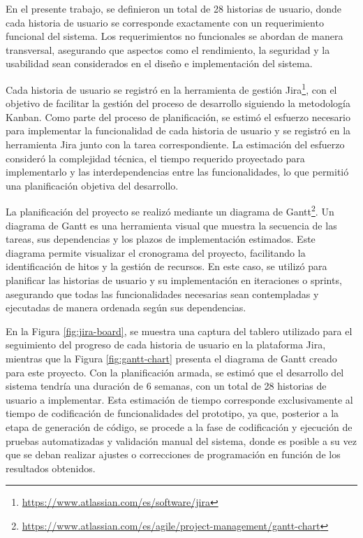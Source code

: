 En el presente trabajo, se definieron un total de 28 historias de usuario, donde cada historia de usuario se corresponde exactamente con un requerimiento funcional del sistema. Los requerimientos no funcionales se abordan de manera transversal, asegurando que aspectos como el rendimiento, la seguridad y la usabilidad sean considerados en el diseño e implementación del sistema.

Cada historia de usuario se registró en la herramienta de gestión Jira\footnote{\url{https://www.atlassian.com/es/software/jira}}, con el objetivo de facilitar la gestión del proceso de desarrollo siguiendo la metodología Kanban. Como parte del proceso de planificación, se estimó el esfuerzo necesario para implementar la funcionalidad de cada historia de usuario y se registró en la herramienta Jira junto con la tarea correspondiente. La estimación del esfuerzo consideró la complejidad técnica, el tiempo requerido proyectado para implementarlo y las interdependencias entre las funcionalidades, lo que permitió una planificación objetiva del desarrollo.

La planificación del proyecto se realizó mediante un diagrama de Gantt\footnote{\url{https://www.atlassian.com/es/agile/project-management/gantt-chart}}. Un diagrama de Gantt es una herramienta visual que muestra la secuencia de las tareas, sus dependencias y los plazos de implementación estimados. Este diagrama permite visualizar el cronograma del proyecto, facilitando la identificación de hitos y la gestión de recursos. En este caso, se utilizó para planificar las historias de usuario y su implementación en iteraciones o sprints, asegurando que todas las funcionalidades necesarias sean contempladas y ejecutadas de manera ordenada según sus dependencias.

En la Figura \ref{fig:jira-board}, se muestra una captura del tablero utilizado para el seguimiento del progreso de cada historia de usuario en la plataforma Jira, mientras que la Figura \ref{fig:gantt-chart} presenta el diagrama de Gantt creado para este proyecto. Con la planificación armada, se estimó que el desarrollo del sistema tendría una duración de 6 semanas, con un total de 28 historias de usuario a implementar. Esta estimación de tiempo corresponde exclusivamente al tiempo de codificación de funcionalidades del prototipo, ya que, posterior a la etapa de generación de código, se procede a la fase de codificación y ejecución de pruebas automatizadas y validación manual del sistema, donde es posible a su vez que se deban realizar ajustes o correcciones de programación en función de los resultados obtenidos.

